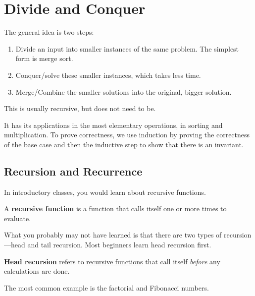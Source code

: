 \section{Divide and Conquer} 

  \begin{definition}
    \label{def:divide-and-conquer-algorithms}
    The general idea is two steps: 
    \begin{enumerate}
      \item Divide an input into smaller instances of the same problem. The simplest form is merge sort. 
      \item Conquer/solve these smaller instances, which takes less time. 
      \item Merge/Combine the smaller solutions into the original, bigger solution. 
    \end{enumerate}
    This is usually recursive, but does not need to be. 
  \end{definition}

  It has its applications in the most elementary operations, in sorting and multiplication. To prove correctness, we use induction by proving the correctness of the base case and then the inductive step to show that there is an invariant. 

\subsection{Recursion and Recurrence}

  In introductory classes, you would learn about recursive functions. 

  \begin{definition}
    \label{def:recursive-function}
    A \textbf{recursive function} is a function that calls itself one or more times to evaluate. 
  \end{definition}

  What you probably may not have learned is that there are two types of recursion---head and tail recursion. Most beginners learn head recursion first. 

  \begin{definition}
    \label{def:head-recursion}
    \textbf{Head recursion} refers to \hyperref[def:recursive-function]{recursive functions} that call itself \textit{before} any calculations are done. 
  \end{definition}

  The most common example is the factorial and Fibonacci numbers. 

